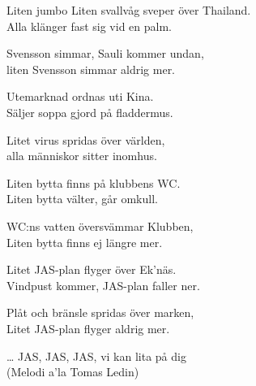 \begin{song}{Liten jumbo}
    \showversenumber
	Liten svallvåg sveper över Thailand.\\
	Alla klänger fast sig vid en palm.\\
	\begin{repetition}
		Svensson simmar, Sauli kommer undan,\\
		liten Svensson simmar aldrig mer.
	\end{repetition}
	
    \showversenumber
	Utemarknad ordnas uti Kina.\\
	Säljer soppa gjord på fladdermus.\\
	\begin{repetition}
		Litet virus spridas över världen,\\
		alla människor sitter inomhus.
	\end{repetition}
	
	\showversenumber
	Liten bytta finns på klubbens WC.\\
	Liten bytta välter, går omkull.\\
	\begin{repetition}
		WC:ns vatten översvämmar Klubben,\\
		Liten bytta finns ej längre mer.
	\end{repetition}
	
    \showversenumber
	Litet JAS-plan flyger över Ek'näs.\\
	Vindpust kommer, JAS-plan faller ner.\\
	\begin{repetition}
		Plåt och bränsle spridas över marken,\\
		Litet JAS-plan flyger aldrig mer.
	\end{repetition}
	
	\ldots{} JAS, JAS, JAS, vi kan lita på dig\\
	\hspace*{3ex} (Melodi a'la Tomas Ledin)
	
\end{song}
